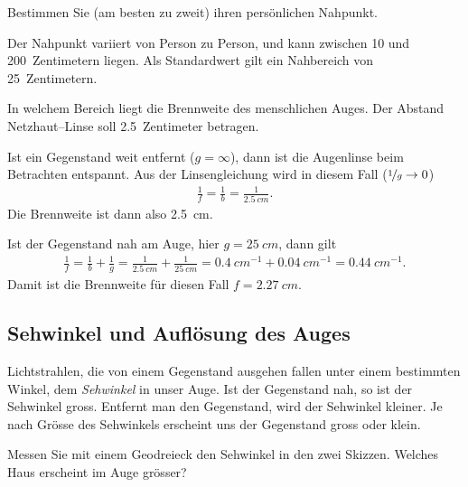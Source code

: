 \documentclass[12pt,a4paper,twoside]{article}
\begin{document}
\begin{aufgabe}
	Bestimmen Sie (am besten zu zweit) ihren persönlichen Nahpunkt.
	\begin{loesung}
		Der Nahpunkt variiert von Person zu Person, und kann zwischen 10 und \SI{200}{Zentimetern} liegen.
Als Standardwert gilt ein Nahbereich von \SI{25}{Zentimetern}.
	\end{loesung}
\end{aufgabe}
\begin{aufgabe}
	In welchem Bereich liegt die Brennweite des menschlichen Auges. Der Abstand Netzhaut--Linse soll \SI{2.5}{Zentimeter} betragen.
	\begin{loesung}
		Ist ein Gegenstand weit entfernt ($g=\infty$), dann ist die Augenlinse beim Betrachten entspannt.
		Aus der Linsengleichung wird in diesem Fall ($\nicefrac{1}{g}\to 0$)
		\begin{eqnarray*}
			\frac{1}{f}=\frac{1}{b}=\frac{1}{\SI{2.5}{cm}}\text{.}
		\end{eqnarray*}
		Die Brennweite ist dann also \SI{2.5}{cm}.

		Ist der Gegenstand nah am Auge, hier $g=\SI{25}{cm}$, dann gilt
		\begin{eqnarray*}
			\frac{1}{f}=\frac{1}{b} + \frac{1}{g} =\frac{1}{\SI{2.5}{cm}} + \frac{1}{\SI{25}{cm}}=\SI{0.4}{cm^{-1}} + \SI{0.04}{cm^{-1}}=\SI{0.44}{cm^{-1}}\text{.}
		\end{eqnarray*}
		Damit ist die Brennweite für diesen Fall $f=\SI{2.27}{cm}$.
	\end{loesung}
\end{aufgabe}

\subsection{Sehwinkel und Auflösung des Auges}
Lichtstrahlen, die von einem Gegenstand ausgehen fallen unter einem bestimmten Winkel, dem \emph{Sehwinkel} in unser Auge.
Ist der Gegenstand nah, so ist der Sehwinkel gross. Entfernt man den Gegenstand, wird der Sehwinkel kleiner.
Je nach Grösse des Sehwinkels erscheint uns der Gegenstand gross oder klein.

\begin{aufgabe}
	Messen Sie mit einem Geodreieck den Sehwinkel in den zwei Skizzen. Welches Haus erscheint im Auge grösser?
\begin{center}
\end{center}
\end{aufgabe}
\end{document}
